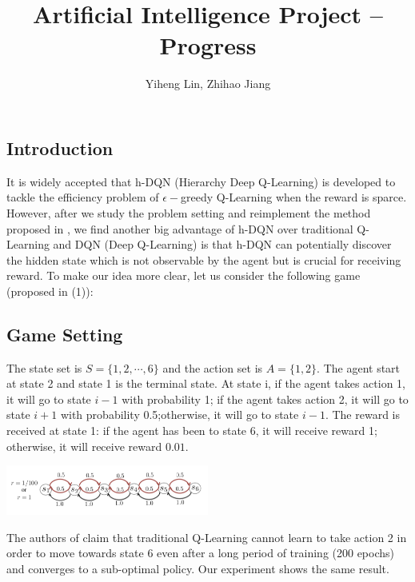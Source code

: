 \documentclass{article}
\title{\textmd{\bf Artificial Intelligence Project -- Progress}}
\date{}
\author{Yiheng Lin, Zhihao Jiang}
\begin{document}
    \begin{spacing}{1.1}
    \maketitle %

    \section{Introduction}
    It is widely accepted that h-DQN (Hierarchy Deep Q-Learning) is developed to tackle the efficiency problem of $\epsilon -$greedy Q-Learning when the reward is sparce. However, after we study the problem setting and reimplement the method proposed in \cite{AI-16}, we find another big advantage of h-DQN over traditional Q-Learning and DQN (Deep Q-Learning) \cite{AI-15} is that h-DQN can potentially discover the hidden state which is not observable by the agent but is crucial for receiving reward. To make our idea more clear, let us consider the following game (proposed in (1)):
    \subsection{Game Setting}
    The state set is $S = \{1, 2, \cdots, 6\}$ and the action set is $A = \{1, 2\}$. The agent start at state 2 and state 1 is the terminal state. At state i, if the agent takes action 1, it will go to state $i-1$ with probability 1; if the agent takes action 2, it will go to state $i+1$ with probability 0.5;otherwise, it will go to state $i-1$. The reward is received at state 1: if the agent has been to state 6, it will receive reward 1; otherwise, it will receive reward $0.01$.

    \begin{center}
        \includegraphics[width = 0.5\textwidth]{game.png}
    \end{center}

    The authors of \cite{AI-16} claim that traditional Q-Learning cannot learn to take action 2 in order to move towards state 6 even after a long period of training (200 epochs) and converges to a sub-optimal policy. Our experiment shows the same result.


\end{spacing}
\end{document}
